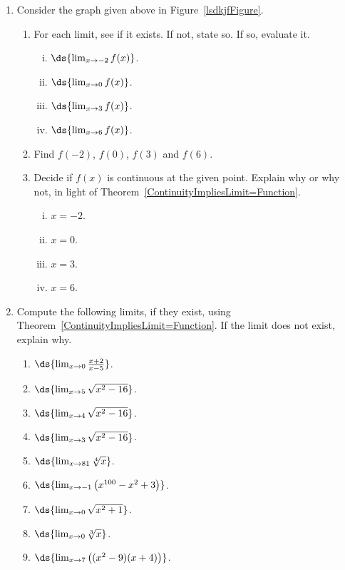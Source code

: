 \begin{multicols}{2}
\begin{enumerate}
\item  \label{lsdkjf}
Consider the graph given above in Figure~\ref{lsdkjfFigure}.

\begin{enumerate}

 \item For each limit, see if it exists.  If not,
          state so.  If so, evaluate it. 
  \begin{enumerate}[(i)]
  \item $\ds{\lim_{x\to-2}f(x)}$.
  \item $\ds{\lim_{x\to0}f(x)}$.
  \item $\ds{\lim_{x\to3}f(x)}$.
  \item $\ds{\lim_{x\to6}f(x)}$.
  \end{enumerate}
 \item Find $f(-2)$, $f(0)$, $f(3)$ and $f(6)$.
 \item Decide if $f(x)$ is continuous at the given
          point.  Explain why or why not, in light of  
          Theorem~\ref{ContinuityImpliesLimit=Function}.
  \begin{enumerate}[(i)]
  \item $x=-2$.
  \item $x=0$.
  \item $x=3$.
  \item $x=6$.
  \end{enumerate}
 \end{enumerate}


\item  Compute the following limits, if they exist, using
Theorem~\ref{ContinuityImpliesLimit=Function}.  If the 
limit does not exist, explain why.
 \begin{enumerate}
 \item $\ds{\lim_{x\to0}\frac{x+2}{x-5}}$.
 \item $\ds{\lim_{x\to5}\sqrt{x^2-16}}$.%
 \item $\ds{\lim_{x\to4}\sqrt{x^2-16}}$.%
 \item $\ds{\lim_{x\to3}\sqrt{x^2-16}}$.%
 \item $\ds{\lim_{x\to81}\sqrt[4]{x}}$.
 \item $\ds{\lim_{x\to-1}\left(x^{100}-x^2+3\right)}$.
 \item $\ds{\lim_{x\to0}\sqrt{x^2+1}}$.
 \item $\ds{\lim_{x\to0}\sqrt[3]{x}}$.
 \item $\ds{\lim_{x\to7}\left((x^2-9)(x+4)\right)}$.
 \end{enumerate}


\end{enumerate}
\end{multicols}
